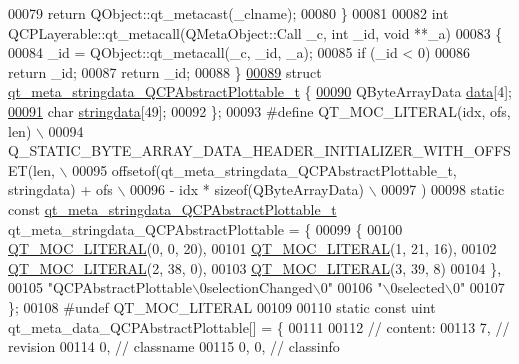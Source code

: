\begin{DoxyCode}
00079     \textcolor{keywordflow}{return} QObject::qt\_metacast(\_clname);
00080 \}
00081 
00082 \textcolor{keywordtype}{int} QCPLayerable::qt\_metacall(QMetaObject::Call \_c, \textcolor{keywordtype}{int} \_id, \textcolor{keywordtype}{void} **\_a)
00083 \{
00084     \_id = QObject::qt\_metacall(\_c, \_id, \_a);
00085     \textcolor{keywordflow}{if} (\_id < 0)
00086         \textcolor{keywordflow}{return} \_id;
00087     \textcolor{keywordflow}{return} \_id;
00088 \}
\hypertarget{a00016_source_l00089}{}\hyperlink{a00016}{00089} \textcolor{keyword}{struct }\hyperlink{a00016_da/d74/a00099}{qt\_meta\_stringdata\_QCPAbstractPlottable\_t} \{
\hypertarget{a00016_source_l00090}{}\hyperlink{a00016_ac951832cc81d6220c552b96fc4354c89}{00090}     QByteArrayData \hyperlink{a00016_ac951832cc81d6220c552b96fc4354c89}{data}[4];
\hypertarget{a00016_source_l00091}{}\hyperlink{a00016_ab78c50bc348c723bab72ef878f28856c}{00091}     \textcolor{keywordtype}{char} \hyperlink{a00016_ab78c50bc348c723bab72ef878f28856c}{stringdata}[49];
00092 \};
00093 \textcolor{preprocessor}{#define QT\_MOC\_LITERAL(idx, ofs, len) \(\backslash\)}
00094 \textcolor{preprocessor}{    Q\_STATIC\_BYTE\_ARRAY\_DATA\_HEADER\_INITIALIZER\_WITH\_OFFSET(len, \(\backslash\)}
00095 \textcolor{preprocessor}{    offsetof(qt\_meta\_stringdata\_QCPAbstractPlottable\_t, stringdata) + ofs \(\backslash\)}
00096 \textcolor{preprocessor}{        - idx * sizeof(QByteArrayData) \(\backslash\)}
00097 \textcolor{preprocessor}{    )}
00098 \textcolor{keyword}{static} \textcolor{keyword}{const} \hyperlink{a00016_da/d74/a00099}{qt\_meta\_stringdata\_QCPAbstractPlottable\_t} 
      qt\_meta\_stringdata\_QCPAbstractPlottable = \{
00099     \{
00100 \hyperlink{a00016_a75bb9482d242cde0a06c9dbdc6b83abe}{QT\_MOC\_LITERAL}(0, 0, 20),
00101 \hyperlink{a00016_a75bb9482d242cde0a06c9dbdc6b83abe}{QT\_MOC\_LITERAL}(1, 21, 16),
00102 \hyperlink{a00016_a75bb9482d242cde0a06c9dbdc6b83abe}{QT\_MOC\_LITERAL}(2, 38, 0),
00103 \hyperlink{a00016_a75bb9482d242cde0a06c9dbdc6b83abe}{QT\_MOC\_LITERAL}(3, 39, 8)
00104     \},
00105     \textcolor{stringliteral}{"QCPAbstractPlottable\(\backslash\)0selectionChanged\(\backslash\)0"}
00106     \textcolor{stringliteral}{"\(\backslash\)0selected\(\backslash\)0"}
00107 \};
00108 \textcolor{preprocessor}{#undef QT\_MOC\_LITERAL}
00109 
00110 \textcolor{keyword}{static} \textcolor{keyword}{const} uint qt\_meta\_data\_QCPAbstractPlottable[] = \{
00111 
00112  \textcolor{comment}{// content:}
00113        7,       \textcolor{comment}{// revision}
00114        0,       \textcolor{comment}{// classname}
00115        0,    0, \textcolor{comment}{// classinfo}

\end{DoxyCode}
